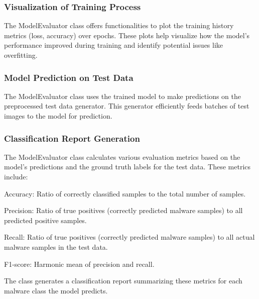\documentclass[conference]{IEEEtran}
\begin{document}
\subsubsection{Visualization of Training Process}

    The ModelEvaluator class  offers functionalities to plot the training history metrics (loss, accuracy) over epochs. These plots help visualize how the model's performance improved during training and identify potential issues like overfitting.

\subsubsection{Model Prediction on Test Data}

    The ModelEvaluator class uses the trained model to make predictions on the preprocessed test data generator. This generator efficiently feeds batches of test images to the model for prediction.

\subsubsection{Classification Report Generation}

    The ModelEvaluator class  calculates various evaluation metrics based on the model's predictions and the ground truth labels for the test data. These metrics include:
        
        Accuracy: Ratio of correctly classified samples to the total number of samples.
        
        Precision: Ratio of true positives (correctly predicted malware samples) to all predicted positive samples.
        
        Recall: Ratio of true positives (correctly predicted malware samples) to all actual malware samples in the test data.
        
        F1-score: Harmonic mean of precision and recall.
    
    The class  generates a classification report summarizing these metrics for each malware class the model predicts.
\end{document}
